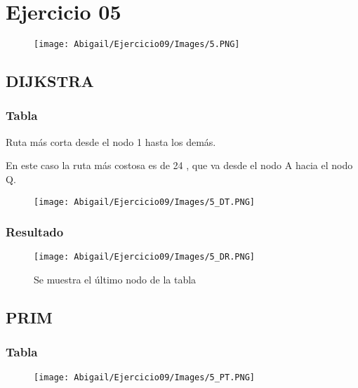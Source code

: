 \documentclass[12pt]{article}
\begin{document}
  \section{Ejercicio 05}

    \begin{figure}[h!]
      \centering
      \texttt{[image: Abigail/Ejercicio09/Images/5.PNG]}
    \end{figure} 

    \subsection{DIJKSTRA}

      \subsubsection{Tabla}
         Ruta más corta desde el nodo 1 hasta los demás.
        
        En este caso la ruta más costosa es de 24 , que va desde el nodo A hacia el nodo Q.

       \begin{figure}[h!]
          \centering
          \texttt{[image: Abigail/Ejercicio09/Images/5\_DT.PNG]}
        \end{figure} 
\newpage

      \subsubsection{Resultado}
        \begin{figure}[h!]
          \centering
          \texttt{[image: Abigail/Ejercicio09/Images/5\_DR.PNG]}
          \caption{Se muestra el último nodo de la tabla}
        \end{figure} 

    \subsection{PRIM}

      \subsubsection{Tabla}
        \begin{figure}[h!]
          \centering
          \texttt{[image: Abigail/Ejercicio09/Images/5\_PT.PNG]}
        \end{figure} 
\end{document}
